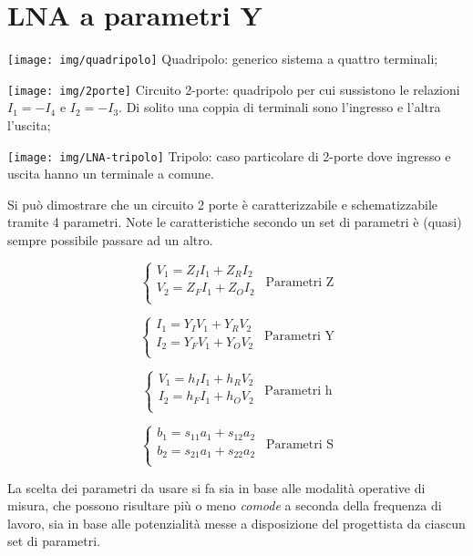 \chapter{LNA a parametri Y}

\begin{multicols}{3}
	\texttt{[image: img/quadripolo]}
	Quadripolo: generico sistema a quattro terminali;
	\columnbreak
	
	\texttt{[image: img/2porte]}
	Circuito 2-porte: quadripolo per cui sussistono le relazioni $I_1 = -I_4$ e $I_2 = -I_3$. Di solito una coppia di terminali sono l'ingresso e l'altra l'uscita;
	\columnbreak
	
	\texttt{[image: img/LNA-tripolo]}
	Tripolo: caso particolare di 2-porte dove ingresso e uscita hanno un terminale a comune.
\end{multicols}

Si può dimostrare che un circuito 2 porte è caratterizzabile e schematizzabile tramite 4 parametri. Note le caratteristiche secondo un set di parametri è (quasi) sempre possibile passare ad un altro.

\begin{multicols}{2}
	$$\begin{cases}
	V_1 = Z_I I_1 + Z_R I_2\\
	V_2 = Z_F I_1 + Z_O I_2\\		
	\end{cases}
	~~ \mbox{Parametri Z}$$
	
	$$\begin{cases}
	I_1 = Y_I V_1 + Y_R V_2\\
	I_2 = Y_F V_1 + Y_O V_2\\		
	\end{cases}
	~~ \mbox{Parametri Y}$$
	
	$$\begin{cases}
	V_1 = h_I I_1 + h_R V_2\\
	I_2 = h_F I_1 + h_O V_2\\		
	\end{cases}
	~~ \mbox{Parametri h}$$
	
	$$\begin{cases}
	b_1 = s_{11} a_1 + s_{12} a_2\\
	b_2 = s_{21} a_1 + s_{22} a_2\\		
	\end{cases}
	~~ \mbox{Parametri S}$$
\end{multicols}

La scelta dei parametri da usare si fa sia in base alle modalità
operative di misura, che possono risultare più o meno \textit{comode} a seconda della frequenza di lavoro, sia in base alle potenzialità messe a disposizione del progettista da ciascun set di parametri.

